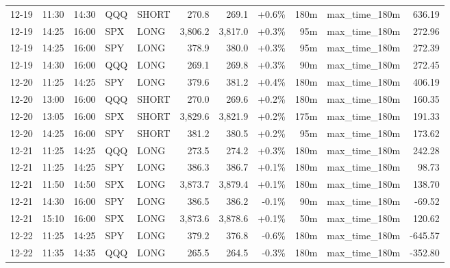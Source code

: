 \documentclass[11pt,a4paper,twoside]{article}
\begin{document}
\begin{center}
\begin{longtable}{>{\color{txtmain}}l l l l l r r r r >{\color{txtmain}}l r}
12-19 & 11:30 & 14:30 & QQQ & SHORT & 270.8 & 269.1 & \textcolor{wingreen}{+0.6\%} & 180m & max\_time\_180m & \textcolor{wingreen}{636.19} \\
12-19 & 14:25 & 16:00 & SPX & LONG & 3,806.2 & 3,817.0 & \textcolor{wingreen}{+0.3\%} & 95m & max\_time\_180m & \textcolor{wingreen}{272.96} \\
12-19 & 14:25 & 16:00 & SPY & LONG & 378.9 & 380.0 & \textcolor{wingreen}{+0.3\%} & 95m & max\_time\_180m & \textcolor{wingreen}{272.39} \\
12-19 & 14:30 & 16:00 & QQQ & LONG & 269.1 & 269.8 & \textcolor{wingreen}{+0.3\%} & 90m & max\_time\_180m & \textcolor{wingreen}{272.45} \\
12-20 & 11:25 & 14:25 & SPY & LONG & 379.6 & 381.2 & \textcolor{wingreen}{+0.4\%} & 180m & max\_time\_180m & \textcolor{wingreen}{406.19} \\
12-20 & 13:00 & 16:00 & QQQ & SHORT & 270.0 & 269.6 & \textcolor{wingreen}{+0.2\%} & 180m & max\_time\_180m & \textcolor{wingreen}{160.35} \\
12-20 & 13:05 & 16:00 & SPX & SHORT & 3,829.6 & 3,821.9 & \textcolor{wingreen}{+0.2\%} & 175m & max\_time\_180m & \textcolor{wingreen}{191.33} \\
12-20 & 14:25 & 16:00 & SPY & SHORT & 381.2 & 380.5 & \textcolor{wingreen}{+0.2\%} & 95m & max\_time\_180m & \textcolor{wingreen}{173.62} \\
12-21 & 11:25 & 14:25 & QQQ & LONG & 273.5 & 274.2 & \textcolor{wingreen}{+0.3\%} & 180m & max\_time\_180m & \textcolor{wingreen}{242.28} \\
12-21 & 11:25 & 14:25 & SPY & LONG & 386.3 & 386.7 & \textcolor{wingreen}{+0.1\%} & 180m & max\_time\_180m & \textcolor{wingreen}{98.73} \\
12-21 & 11:50 & 14:50 & SPX & LONG & 3,873.7 & 3,879.4 & \textcolor{wingreen}{+0.1\%} & 180m & max\_time\_180m & \textcolor{wingreen}{138.70} \\
12-21 & 14:30 & 16:00 & SPY & LONG & 386.5 & 386.2 & \textcolor{lossred}{-0.1\%} & 90m & max\_time\_180m & \textcolor{lossred}{-69.52} \\
12-21 & 15:10 & 16:00 & SPX & LONG & 3,873.6 & 3,878.6 & \textcolor{wingreen}{+0.1\%} & 50m & max\_time\_180m & \textcolor{wingreen}{120.62} \\
12-22 & 11:25 & 14:25 & SPY & LONG & 379.2 & 376.8 & \textcolor{lossred}{-0.6\%} & 180m & max\_time\_180m & \textcolor{lossred}{-645.57} \\
12-22 & 11:35 & 14:35 & QQQ & LONG & 265.5 & 264.5 & \textcolor{lossred}{-0.3\%} & 180m & max\_time\_180m & \textcolor{lossred}{-352.80} \\

\end{longtable}
\end{center}
\end{document}
